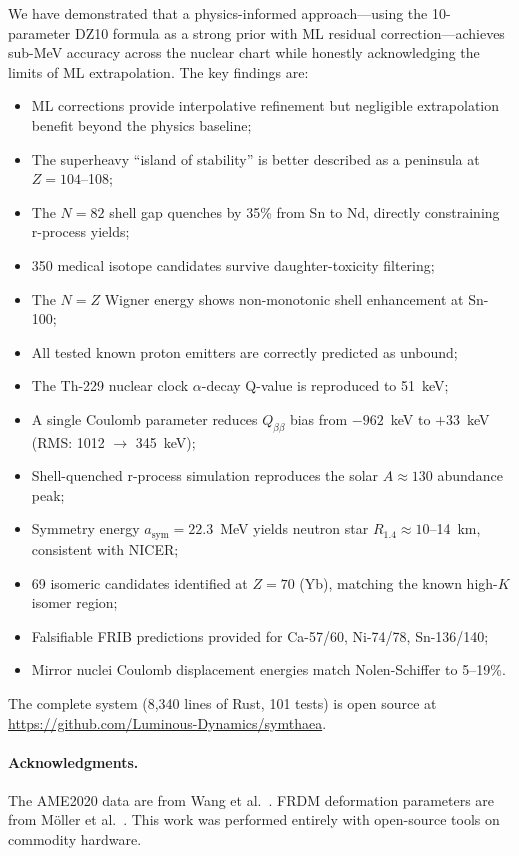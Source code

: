 \documentclass[twocolumn,letterpaper,10pt]{article}
\begin{document}
We have demonstrated that a physics-informed approach---using the
10-parameter DZ10 formula as a strong prior with ML residual
correction---achieves sub-MeV accuracy across the nuclear chart while
honestly acknowledging the limits of ML extrapolation. The key findings
are:
\begin{itemize}
\item ML corrections provide interpolative refinement but negligible
      extrapolation benefit beyond the physics baseline;
\item The superheavy ``island of stability'' is better described as a
      peninsula at $Z=104$--108;
\item The $N=82$ shell gap quenches by 35\% from Sn to Nd, directly
      constraining r-process yields;
\item 350 medical isotope candidates survive daughter-toxicity filtering;
\item The $N=Z$ Wigner energy shows non-monotonic shell enhancement at
      Sn-100;
\item All tested known proton emitters are correctly predicted as unbound;
\item The Th-229 nuclear clock $\alpha$-decay Q-value is reproduced to
      51~keV;
\item A single Coulomb parameter reduces $Q_{\beta\beta}$ bias from
      $-962$~keV to $+33$~keV (RMS: 1012 $\to$ 345~keV);
\item Shell-quenched r-process simulation reproduces the solar
      $A \approx 130$ abundance peak;
\item Symmetry energy $a_\text{sym} = 22.3$~MeV yields neutron star
      $R_{1.4} \approx 10$--14~km, consistent with NICER;
\item 69 isomeric candidates identified at $Z=70$ (Yb), matching the
      known high-$K$ isomer region;
\item Falsifiable FRIB predictions provided for Ca-57/60, Ni-74/78,
      Sn-136/140;
\item Mirror nuclei Coulomb displacement energies match Nolen-Schiffer
      to 5--19\%.
\end{itemize}

The complete system (8,340 lines of Rust, 101 tests) is open source at
\url{https://github.com/Luminous-Dynamics/symthaea}.

\paragraph{Acknowledgments.}
The AME2020 data are from Wang et al.~\cite{ame2020}. FRDM deformation
parameters are from M\"oller et al.~\cite{moller2016}. This work was
performed entirely with open-source tools on commodity hardware.
\end{document}
